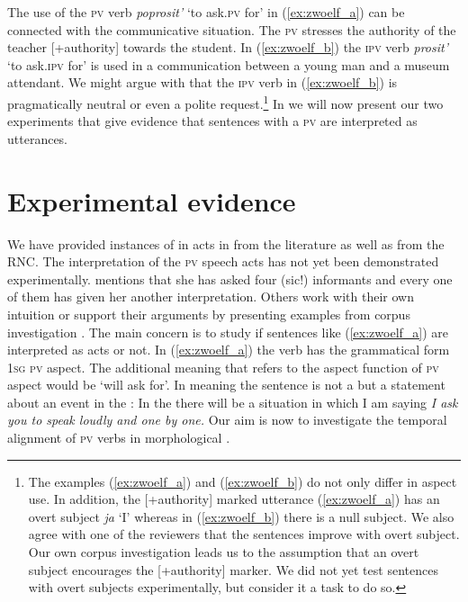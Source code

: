 \documentclass[output=paper,colorlinks,citecolor=brown,newtxmath,hidelinks]{langscibook}
\begin{document}
\noindent The use of the \textsc{pv} verb \textit{poprosit’} ‘to ask\textsc{.pv} for’ in (\ref{ex:zwoelf_a}) can be connected with the communicative situation. The \textsc{pv}  stresses the authority of the teacher [+authority] towards the student. In (\ref{ex:zwoelf_b}) the \textsc{ipv} verb \textit{prosit’} ‘to ask\textsc{.ipv} for’ is used in a communication between a young man and a museum attendant. We might argue with \citeauthor{Israeli2001} that the \textsc{ipv} verb in (\ref{ex:zwoelf_b}) is pragmatically neutral or even a polite request.\footnote{The examples (\ref{ex:zwoelf_a}) and (\ref{ex:zwoelf_b}) do not only differ in aspect use. In addition, the [+authority] marked utterance (\ref{ex:zwoelf_a}) has an overt subject \textit{ja} ‘I’ whereas in (\ref{ex:zwoelf_b}) there is a null subject. We also agree with one of the reviewers that the sentences improve with overt subject. Our own corpus investigation leads us to the assumption that an overt subject encourages the [+authority] marker. We did not yet test sentences with overt subjects experimentally, but consider it a  task to do so.\label{fn5}} In  we will now present our two experiments that give evidence that sentences with a \textsc{pv}  are interpreted as  utterances. 

\section{Experimental evidence}\label{sct:zwei}

We have provided instances of   in  acts in  from the literature as well as from the RNC. The interpretation of the \textsc{pv} speech acts has not yet been demonstrated experimentally. \citet{Rathmayr1976} mentions that she has asked four (sic!) informants and every one of them has given her another interpretation. Others work with their own intuition or support their arguments by presenting examples from corpus investigation \citep{Wiemer2014,Laczinski2014}. The main concern is to study if sentences like (\ref{ex:zwoelf_a}) are interpreted as  acts or not. In (\ref{ex:zwoelf_a}) the verb has the grammatical form \textsc{1sg pv} aspect. The additional meaning that refers to the aspect function of \textsc{pv} aspect would be ‘will ask for’. In  meaning the sentence is not a  but a statement about an event in the : In the  there will be a situation in which I am saying \textit{I ask you to speak loudly and one by one.} Our aim is now to investigate the temporal alignment of \textsc{pv}  verbs in morphological .
\end{document}
